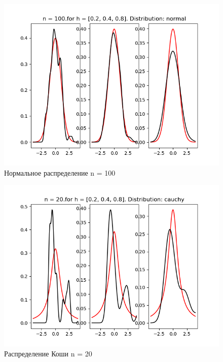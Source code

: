 \documentclass[a4]{article}
\begin{document}
\begin{center}
\begin{figure}[h!]
		\end{figure}
		\newpage
		\begin{figure}[h!]
			\includegraphics[width=\textwidth]{normalker100.png} 
			\caption[Нормальное распределение n = 100]{Нормальное распределение n = 100}
		\end{figure}
		\newpage
		\begin{figure}[h!]
			\includegraphics[width=\textwidth]{cauchyker20.png}
			\caption[Распределение Коши n = 20]{Распределение Коши n = 20}
		\end{figure}
		\newpage
		\begin{figure}[h!]

\end{figure}
\end{center}
\end{document}
